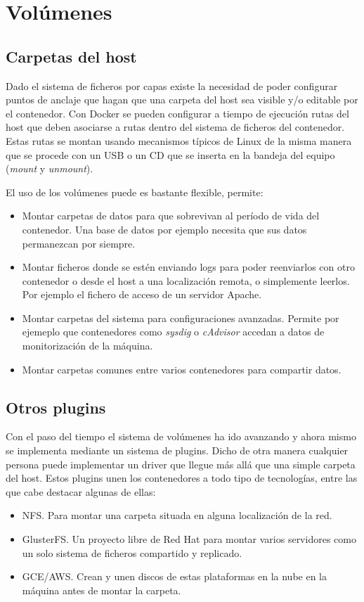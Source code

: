 \section{Volúmenes}
\label{sec:docker-volumenes}

\subsection{Carpetas del host}
\label{sec:docker-volumen-host}

Dado el sistema de ficheros por capas existe la necesidad de poder configurar puntos de anclaje que hagan que una carpeta del host sea visible y/o editable por el contenedor. Con Docker se pueden configurar a tiempo de ejecución rutas del host que deben asociarse a rutas dentro del sistema de ficheros del contenedor. Estas rutas se montan usando mecanismos típicos de Linux de la misma manera que se procede con un USB o un CD que se inserta en la bandeja del equipo (\emph{mount} y \emph{unmount}).

El uso de los volúmenes puede es bastante flexible, permite:
\begin{itemize}
    \item Montar carpetas de datos para que sobrevivan al período de vida del contenedor. Una base de datos por ejemplo necesita que sus datos permanezcan por siempre.
    \item Montar ficheros donde se estén enviando logs para poder reenviarlos con otro contenedor o desde el host a una localización remota, o simplemente leerlos. Por ejemplo el fichero de acceso de un servidor Apache.
    \item Montar carpetas del sistema para configuraciones avanzadas. Permite por ejemeplo que contenedores como \emph{sysdig}\cite{sysdig} o \emph{cAdvisor}\cite{cadvisor} accedan a datos de monitorización de la máquina.
    \item Montar carpetas comunes entre varios contenedores para compartir datos.
\end{itemize}

\subsection{Otros plugins}
\label{sec:docker-volumen-plugins}

Con el paso del tiempo el sistema de volúmenes ha ido avanzando y ahora mismo se implementa mediante un sistema de plugins. Dicho de otra manera cualquier persona puede implementar un driver que llegue más allá que una simple carpeta del host. Estos plugins unen los contenedores a todo tipo de tecnologías\cite{dockervolumeplugins}, entre las que cabe destacar algunas de ellas:
\begin{itemize}
    \item NFS. Para montar una carpeta situada en alguna localización de la red.
    \item GlusterFS. Un proyecto libre de Red Hat para montar varios servidores como un solo sistema de ficheros compartido y replicado.
    \item GCE/AWS. Crean y unen discos de estas plataformas en la nube en la máquina antes de montar la carpeta.
\end{itemize}

